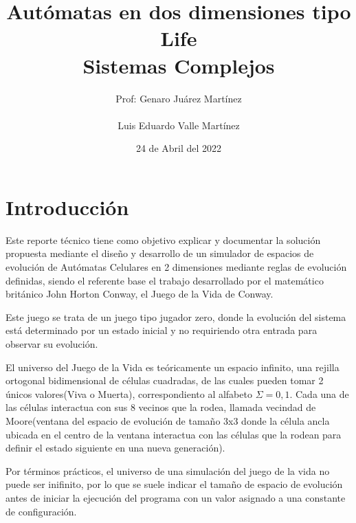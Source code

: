 \documentclass[]{article}
\title{Autómatas en dos dimensiones tipo Life \\\hfill\break Sistemas Complejos}
\author{Prof: Genaro Juárez Martínez \\ \\ Luis Eduardo Valle Martínez}
\date{24 de Abril del 2022}
\begin{document}
\maketitle

\section{Introducción}
% 
	Este reporte técnico tiene como objetivo explicar y documentar la solución propuesta mediante el diseño y desarrollo de un simulador de espacios de evolución de Autómatas Celulares en 2 dimensiones mediante reglas de evolución definidas, siendo el referente base el trabajo desarrollado por el matemático británico John Horton Conway, el Juego de la Vida de Conway.
	
	Este juego se trata de un juego tipo jugador zero, donde la evolución del sistema está determinado por un estado inicial y no requiriendo otra entrada para observar su evolución.
	
	El universo del Juego de la Vida es teóricamente un espacio infinito, una rejilla ortogonal bidimensional de células cuadradas, de las cuales pueden tomar 2 únicos valores(Viva o Muerta), correspondiento al alfabeto $\Sigma = {0,1}$. Cada una de las células interactua con sus 8 vecinos que la rodea, llamada vecindad de Moore(ventana del espacio de evolución de tamaño 3x3 donde la célula ancla ubicada en el centro de la ventana interactua con las células que la rodean para definir el estado siguiente en una nueva generación).
	
	Por términos prácticos, el universo de una simulación del juego de la vida no puede ser inifinito, por lo que se suele indicar el tamaño de espacio de evolución antes de iniciar la ejecución del programa con un valor asignado a una constante de configuración.
	
\end{document}
